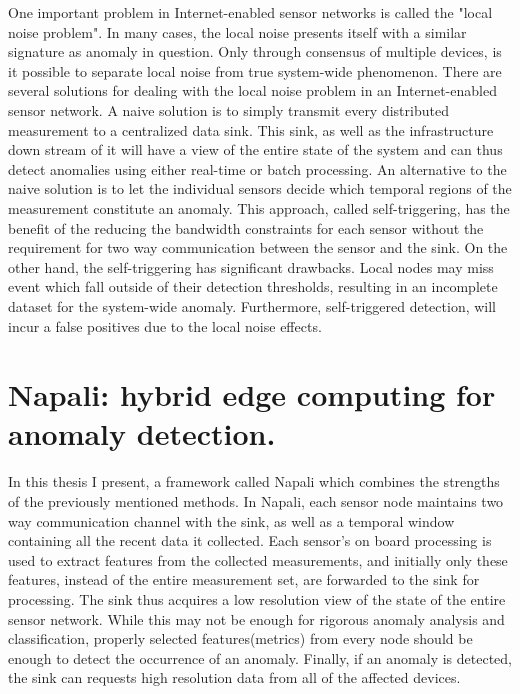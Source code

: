 One important problem in Internet-enabled sensor networks is called the "local noise problem".
In many cases, the local noise presents itself with a similar signature as anomaly in question.
Only through consensus of multiple devices, is it possible to separate local noise from true system-wide phenomenon.
There are several solutions for dealing with the local noise problem in an Internet-enabled sensor network.
A naive solution is to simply transmit every distributed measurement to a centralized data sink.
This sink, as well as the infrastructure down stream of it will have a view of the entire state of the system and can thus detect anomalies using either real-time or batch processing.
An alternative to the naive solution is to let the individual sensors decide which temporal regions of the measurement constitute an anomaly.
This approach, called self-triggering, has the benefit of the reducing the bandwidth constraints for each sensor without the requirement for two way communication between the sensor and the sink.
On the other hand, the self-triggering has significant drawbacks.
Local nodes may miss event which fall outside of their detection thresholds, resulting in an incomplete dataset for the system-wide anomaly.
Furthermore, self-triggered detection, will incur a false positives due to the local noise effects.

\section{Napali: hybrid edge computing for anomaly detection.} \label{intro:section:napali}

In this thesis I present,  a framework called Napali which combines the strengths of the previously mentioned methods.
In Napali, each sensor node maintains two way communication channel with the sink, as well as a temporal window containing all the recent data it collected.
Each sensor's on board processing is used to extract features from the collected measurements, and initially only these features, instead of the entire measurement set, are forwarded to the sink for processing.
The sink thus acquires a low resolution view of the state of the entire sensor network.
While this may not be enough for rigorous anomaly analysis and classification, properly selected features(metrics) from every node should be enough to detect the occurrence of an anomaly.
Finally, if an anomaly is detected, the sink can requests high resolution data from all of the affected devices.

